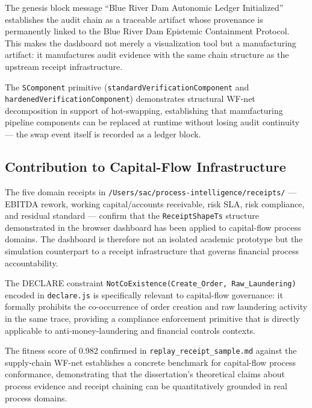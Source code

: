 The genesis block message ``Blue River Dam Autonomic Ledger Initialized'' establishes the audit
chain as a traceable artifact whose provenance is permanently linked to the Blue River Dam
Epistemic Containment Protocol. This makes the dashboard not merely a visualization tool but
a manufacturing artifact: it manufactures audit evidence with the same chain structure as the
upstream receipt infrastructure.

The \texttt{SComponent} primitive (\texttt{standardVerificationComponent} and
\texttt{hardenedVerificationComponent}) demonstrates structural WF-net decomposition in support
of hot-swapping, establishing that manufacturing pipeline components can be replaced at runtime
without losing audit continuity — the swap event itself is recorded as a ledger block.

\subsection{Contribution to Capital-Flow Infrastructure}
\label{sec:experiments-visualizer-contribution-capital}

The five domain receipts in \texttt{/Users/sac/process-intelligence/receipts/} —
EBITDA rework, working capital/accounts receivable, risk SLA, risk compliance, and residual
standard — confirm that the \texttt{ReceiptShapeTs} structure demonstrated in the browser
dashboard has been applied to capital-flow process domains. The dashboard is therefore not an
isolated academic prototype but the simulation counterpart to a receipt infrastructure that
governs financial process accountability.

The DECLARE constraint \texttt{NotCoExistence(Create\_Order, Raw\_Laundering)} encoded in
\texttt{declare.js} is specifically relevant to capital-flow governance: it formally prohibits
the co-occurrence of order creation and raw laundering activity in the same trace, providing
a compliance enforcement primitive that is directly applicable to anti-money-laundering and
financial controls contexts.

The fitness score of 0.982 confirmed in \texttt{replay\_receipt\_sample.md} against the
supply-chain WF-net establishes a concrete benchmark for capital-flow process conformance,
demonstrating that the dissertation's theoretical claims about process evidence and receipt
chaining can be quantitatively grounded in real process domains.

